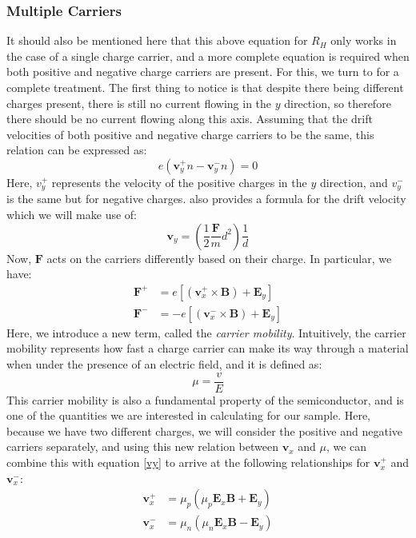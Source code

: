\documentclass[10pt]{article}
\begin{document}
	\subsubsection{Multiple Carriers}
	\label{multiple-carriers}
	It should also be mentioned here that this above equation for \( R_H \) only works in the case of a
	single charge carrier, and a more complete equation is required when both positive and negative charge
	carriers are present. For this, we turn to \cite{melissinos} for a complete treatment. The first thing to 
	notice is that despite there being different charges present, there is still no current flowing in the \(
	y\) direction, so therefore there should be no current flowing along this axis. Assuming that the drift
	velocities of both positive and negative charge carriers to be the same, this relation can be expressed
	as:
	\begin{equation}
		\label{vy}
		e(\mathbf{v}_y^{+}n - \mathbf{v}_y^{-}n) = 0
	\end{equation}
	Here, \( v_y^{+} \) represents the velocity of the positive charges in the \( y \) direction, and \( v_y^{-}
	\) is the same but for negative charges. \cite{melissinos} also provides a formula for the drift velocity which we
	will make use of:
	\[
		\mathbf{v}_y = \left( \frac{1}{2} \frac{\mathbf{F}}{m}d^2 \right)\frac{1}{d}
	\]
	Now, \( \mathbf{F} \) acts on the carriers differently based on their charge. In particular, we have:
	\begin{align*}
		\mathbf{F}^{+} &= e[(\mathbf{v}_x^{+} \times \mathbf{B}) + \mathbf{E}_y] \\ 
		\mathbf{F}^{-} &= -e[(\mathbf{v}_x^{-} \times \mathbf{B}) + \mathbf{E}_y] 
	\end{align*}
	Here, we introduce a new term, called the \textit{carrier mobility}. Intuitively, the carrier mobility
	represents how fast a charge carrier can make its way through a material when under the presence of an
	electric field, and it is defined as:
	\[
		\mu = \frac{v}{E}
	\]
	This carrier mobility is also a fundamental property of the semiconductor, and is one of the quantities
	we are interested in calculating for our sample. Here, because we have two different charges, we will
	consider the positive and negative carriers separately, and using this new relation between \(
	\mathbf{v}_x \) and \( \mu \), we can combine this with equation \ref{vy} to arrive at the following
	relationships for \( \mathbf{v}_x^{+} \) and \( \mathbf{v}_x^{-} \):
	\begin{align*}
		\mathbf{v}_x^{+} &= \mu_p(\mu_p \mathbf{E}_x \mathbf{B} + \mathbf{E}_y)\\
		\mathbf{v}_x^{-} &= \mu_n(\mu_n \mathbf{E}_x \mathbf{B} - \mathbf{E}_y)
	\end{align*}
\end{document}
